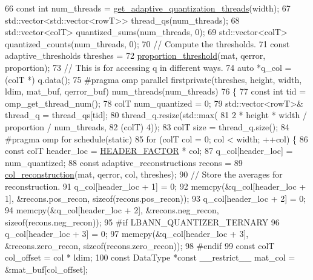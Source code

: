 \begin{DoxyCode}
66   \textcolor{keyword}{const} \textcolor{keywordtype}{int} num\_threads = \hyperlink{classlbann_1_1lbann__quantizer_aaa0c20f755437130172c40ca8e95bc3f}{get\_adaptive\_quantization\_threads}(width);
67   std::vector<std::vector<rowT>> thread\_qs(num\_threads);
68   std::vector<colT> quantized\_sums(num\_threads, 0);
69   std::vector<colT> quantized\_counts(num\_threads, 0);
70   \textcolor{comment}{// Compute the thresholds.}
71   \textcolor{keyword}{const} adaptive\_thresholds threshes =
72     \hyperlink{classlbann_1_1lbann__quantizer_aa5aabc1cb4163e95aee993d9b37b9b32}{proportion\_threshold}(mat, qerror, proportion);
73   \textcolor{comment}{// This is for accessing q in different ways.}
74   \textcolor{keyword}{auto} *q\_col = (colT *) q.data();
75 \textcolor{preprocessor}{  #pragma omp parallel firstprivate(threshes, height, width, ldim, mat\_buf, qerror\_buf)
       num\_threads(num\_threads)}
76   \{
77     \textcolor{keyword}{const} \textcolor{keywordtype}{int} tid = omp\_get\_thread\_num();
78     colT num\_quantized = 0;
79     std::vector<rowT>& thread\_q = thread\_qs[tid];
80     thread\_q.resize(std::max(
81                       2 * height * width / proportion / num\_threads,
82                       (colT) 4));
83     colT size = thread\_q.size();
84 \textcolor{preprocessor}{    #pragma omp for schedule(static)}
85     \textcolor{keywordflow}{for} (colT col = 0; col < width; ++col) \{
86       \textcolor{keyword}{const} colT header\_loc = \hyperlink{classlbann_1_1lbann__quantizer_afb4315625e371169cabfac56c3f75d37}{HEADER\_FACTOR} * col;
87       q\_col[header\_loc] = num\_quantized;
88       \textcolor{keyword}{const} adaptive\_reconstructions recons =
89         \hyperlink{classlbann_1_1lbann__quantizer_af77beca5905ff8601ca9b8231a2a16e0}{col\_reconstruction}(mat, qerror, col, threshes);
90       \textcolor{comment}{// Store the averages for reconstruction.}
91       q\_col[header\_loc + 1] = 0;
92       memcpy(&q\_col[header\_loc + 1], &recons.pos\_recon, \textcolor{keyword}{sizeof}(recons.pos\_recon));
93       q\_col[header\_loc + 2] = 0;
94       memcpy(&q\_col[header\_loc + 2], &recons.neg\_recon, \textcolor{keyword}{sizeof}(recons.neg\_recon));
95 \textcolor{preprocessor}{#if LBANN\_QUANTIZER\_TERNARY}
96       q\_col[header\_loc + 3] = 0;
97       memcpy(&q\_col[header\_loc + 3], &recons.zero\_recon, \textcolor{keyword}{sizeof}(recons.zero\_recon));
98 \textcolor{preprocessor}{#endif}
99       \textcolor{keyword}{const} colT col\_offset = col * ldim;
100       \textcolor{keyword}{const} DataType *\textcolor{keyword}{const} \_\_restrict\_\_ mat\_col = &mat\_buf[col\_offset];

\end{DoxyCode}
